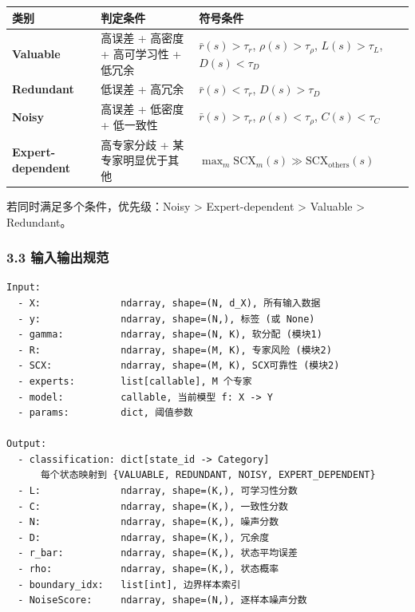 \documentclass[
  12pt,
]{ctexart}
\begin{document}
\begin{longtable}[]{@{}
  >{\raggedright\arraybackslash}p{}
  >{\raggedright\arraybackslash}p{}
  >{\raggedright\arraybackslash}p{}@{}}
\toprule\noalign{}
\begin{minipage}[b]{\linewidth}\raggedright
类别
\end{minipage} & \begin{minipage}[b]{\linewidth}\raggedright
判定条件
\end{minipage} & \begin{minipage}[b]{\linewidth}\raggedright
符号条件
\end{minipage} \\
\midrule\noalign{}
\endhead
\bottomrule\noalign{}
\endlastfoot
\textbf{Valuable} & 高误差 + 高密度 + 高可学习性 + 低冗余 &
\(\bar{r}(s) > \tau_r\), \(\rho(s) > \tau_\rho\), \(L(s) > \tau_L\),
\(D(s) < \tau_D\) \\
\textbf{Redundant} & 低误差 + 高冗余 & \(\bar{r}(s) < \tau_r\),
\(D(s) > \tau_D\) \\
\textbf{Noisy} & 高误差 + 低密度 + 低一致性 & \(\bar{r}(s) > \tau_r\),
\(\rho(s) < \tau_\rho\), \(C(s) < \tau_C\) \\
\textbf{Expert-dependent} & 高专家分歧 + 某专家明显优于其他 &
\(\max_m \text{SCX}_m(s) \gg \text{SCX}_{\text{others}}(s)\) \\
\end{longtable}

若同时满足多个条件，优先级：Noisy \textgreater{} Expert-dependent
\textgreater{} Valuable \textgreater{} Redundant。

\subsubsection{3.3
输入输出规范}\label{ux8f93ux5165ux8f93ux51faux89c4ux8303-2}

\begin{verbatim}
Input:
  - X:              ndarray, shape=(N, d_X), 所有输入数据
  - y:              ndarray, shape=(N,), 标签 (或 None)
  - gamma:          ndarray, shape=(N, K), 软分配 (模块1)
  - R:              ndarray, shape=(M, K), 专家风险 (模块2)
  - SCX:            ndarray, shape=(M, K), SCX可靠性 (模块2)
  - experts:        list[callable], M 个专家
  - model:          callable, 当前模型 f: X -> Y
  - params:         dict, 阈值参数

Output:
  - classification: dict[state_id -> Category]
      每个状态映射到 {VALUABLE, REDUNDANT, NOISY, EXPERT_DEPENDENT}
  - L:              ndarray, shape=(K,), 可学习性分数
  - C:              ndarray, shape=(K,), 一致性分数
  - N:              ndarray, shape=(K,), 噪声分数
  - D:              ndarray, shape=(K,), 冗余度
  - r_bar:          ndarray, shape=(K,), 状态平均误差
  - rho:            ndarray, shape=(K,), 状态概率
  - boundary_idx:   list[int], 边界样本索引
  - NoiseScore:     ndarray, shape=(N,), 逐样本噪声分数
\end{verbatim}
\end{document}
